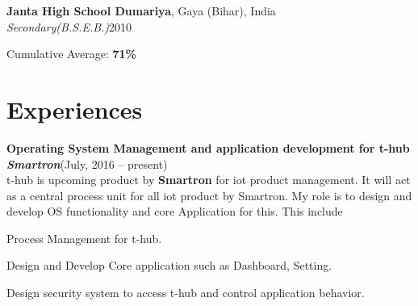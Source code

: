 \documentclass[a4paper,margin,line]{resume}
\begin{document}
\begin{resume}
\begin{list2}
	\end{list2}%

	\textbf{Janta High School Dumariya}, Gaya (Bihar), India\\%
	\textsl{Secondary(B.S.E.B.)}\hfill 2010\vspace{-3mm}\\%
	\begin{list2}%
		\item Cumulative Average: \textbf{71\%}%

	\end{list2}%
	\section{\mysidestyle Experiences}
	\textbf{Operating System Management and application development for t-hub}\vspace{0.5mm}\\%
	\textsl{\textbf{Smartron}}\hfill(July, 2016 -- present)\vspace{1mm}\\%
	t-hub is upcoming product by \textbf{Smartron} for iot product management. It will act as a central process unit for all iot product by Smartron. My role is to design and develop OS functionality and core Application for this. This include 
	\begin{list2}
		\item Process Management for t-hub.
		\item Design and Develop Core application such as Dashboard, Setting.
		\item Design security system to access t-hub and control application behavior.  
	\end{list2}



\end{resume}
\end{document}
